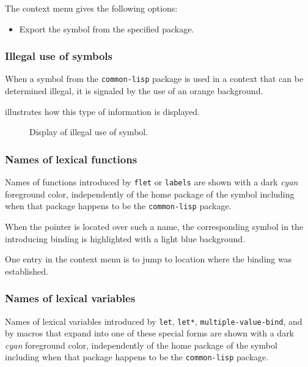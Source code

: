 The context menu gives the following options:

\begin{itemize}
\item Export the symbol from the specified package.
\end{itemize}

\subsubsection{Illegal use of \cl{} symbols}

When a symbol from the \texttt{common-lisp} package is used in a
context that can be determined illegal, it is signaled by the use of
an orange background.

 illustrates how this type of
information is displayed.

\begin{figure}
\begin{center}
\end{center}
\caption{\label{fig-illegal-use-of-cl-symbol}
Display of illegal use of \cl{} symbol.}
\end{figure}

\subsubsection{Names of lexical functions}

Names of functions introduced by \texttt{flet} or \texttt{labels} are
shown with a dark \emph{cyan} foreground color, independently of the
home package of the symbol including when that package happens to be
the \texttt{common-lisp} package.

When the pointer is located over such a name, the corresponding symbol
in the introducing binding is highlighted with a light blue
background. 

One entry in the context menu is to jump to location where the binding
was established. 

\subsubsection{Names of lexical variables}

Names of lexical variables introduced by \texttt{let}, \texttt{let*},
\texttt{multiple-value-bind}, and by macros that expand into one of
these special forms are shown with a dark \emph{cyan}
foreground color, independently of the home package of the symbol
including when that package happens to be the \texttt{common-lisp}
package.

